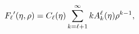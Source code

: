 \[\mathop{F_{\ell}\/}\nolimits'\!\left(\eta,\rho\right)=\mathop{C_{\ell}\/}%
\nolimits\!\left(\eta\right)\sum_{k=\ell+1}^{\infty}kA_{k}^{\ell}(\eta)\rho^{k%
-1},\]